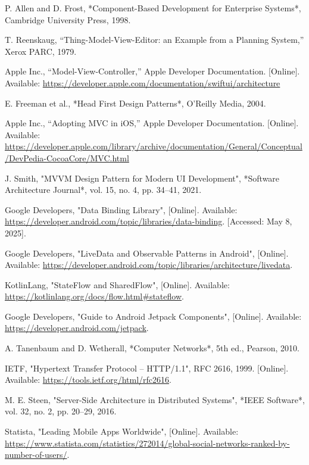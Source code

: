 \documentclass[12pt]{report}
\begin{document}
\begin{thebibliography}{1}
  P. Allen and D. Frost, *Component-Based Development for Enterprise Systems*, Cambridge University Press, 1998.

  T. Reenskaug, ``Thing-Model-View-Editor: an Example from a Planning System,'' Xerox PARC, 1979.

  Apple Inc., ``Model-View-Controller,'' Apple Developer Documentation. [Online]. Available: \url{https://developer.apple.com/documentation/swiftui/architecture}

  E. Freeman et al., *Head First Design Patterns*, O'Reilly Media, 2004.

  Apple Inc., “Adopting MVC in iOS,” Apple Developer Documentation. [Online]. Available: \url{https://developer.apple.com/library/archive/documentation/General/Conceptual/DevPedia-CocoaCore/MVC.html}
  
  J. Smith, "MVVM Design Pattern for Modern UI Development", *Software Architecture Journal*, vol. 15, no. 4, pp. 34–41, 2021.
  
  Google Developers, "Data Binding Library", [Online]. Available: \url{https://developer.android.com/topic/libraries/data-binding}. [Accessed: May 8, 2025].
  
  Google Developers, "LiveData and Observable Patterns in Android", [Online]. Available: \url{https://developer.android.com/topic/libraries/architecture/livedata}.
  
  KotlinLang, "StateFlow and SharedFlow", [Online]. Available: \url{https://kotlinlang.org/docs/flow.html#stateflow}.
  
  Google Developers, "Guide to Android Jetpack Components", [Online]. Available: \url{https://developer.android.com/jetpack}.
  
  A. Tanenbaum and D. Wetherall, *Computer Networks*, 5th ed., Pearson, 2010.
  
  IETF, "Hypertext Transfer Protocol -- HTTP/1.1", RFC 2616, 1999. [Online]. Available: \url{https://tools.ietf.org/html/rfc2616}.
  
  M. E. Steen, "Server-Side Architecture in Distributed Systems", *IEEE Software*, vol. 32, no. 2, pp. 20–29, 2016.
  
  Statista, "Leading Mobile Apps Worldwide", [Online]. Available: \url{https://www.statista.com/statistics/272014/global-social-networks-ranked-by-number-of-users/}.
  



\end{thebibliography}
\end{document}
